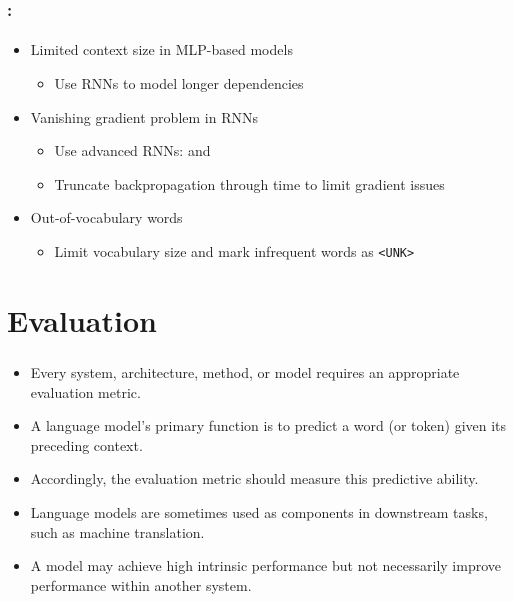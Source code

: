\documentclass[xcolor=table]{beamer}
\begin{document}
\begin{frame}
	\frametitle{\insertshortsubtitle: \insertsection}
	\framesubtitle{\insertsubsection}
	
	\begin{itemize}
		\item Limited context size in MLP-based models
		\begin{itemize}
			\item Use RNNs to model longer dependencies
		\end{itemize}
		\item Vanishing gradient problem in RNNs
		\begin{itemize}
			\item Use advanced RNNs:  and 
			\item Truncate backpropagation through time to limit gradient issues
		\end{itemize}
		\item Out-of-vocabulary words
		\begin{itemize}
			\item Limit vocabulary size and mark infrequent words as \texttt{<UNK>}
		\end{itemize}
	\end{itemize}
	
\end{frame}

\section{Evaluation}

\begin{frame}
	\frametitle{\insertshortsubtitle}
	\framesubtitle{\insertsection}
	
	\begin{itemize}
		\item Every system, architecture, method, or model requires an appropriate evaluation metric.
		\item A language model's primary function is to predict a word (or token) given its preceding context.
		\item Accordingly, the evaluation metric should measure this predictive ability.
		\item Language models are sometimes used as components in downstream tasks, such as machine translation.
		\item A model may achieve high intrinsic performance but not necessarily improve performance within another system.
	\end{itemize}
	
\end{frame}
\end{document}

